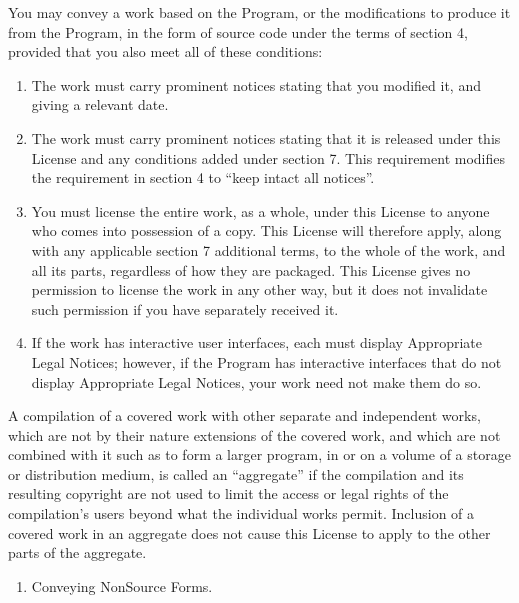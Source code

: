 \documentclass[letterpaper,10pt,english]{sphinxmanual}
\begin{document}
\sphinxAtStartPar
You may convey a work based on the Program, or the modifications to produce it from the Program, in the form of source code under the terms of section 4, provided that you also meet all of these conditions:
\begin{enumerate}
%
\item {} 
\sphinxAtStartPar
The work must carry prominent notices stating that you modified it, and giving a relevant date.

\item {} 
\sphinxAtStartPar
The work must carry prominent notices stating that it is released under this License and any conditions added under section 7. This requirement modifies the requirement in section 4 to “keep intact all notices”.

\item {} 
\sphinxAtStartPar
You must license the entire work, as a whole, under this License to anyone who comes into possession of a copy. This License will therefore apply, along with any applicable section 7 additional terms, to the whole of the work, and all its parts, regardless of how they are packaged. This License gives no permission to license the work in any other way, but it does not invalidate such permission if you have separately received it.

\item {} 
\sphinxAtStartPar
If the work has interactive user interfaces, each must display Appropriate Legal Notices; however, if the Program has interactive interfaces that do not display Appropriate Legal Notices, your work need not make them do so.

\end{enumerate}

\sphinxAtStartPar
A compilation of a covered work with other separate and independent works, which are not by their nature extensions of the covered work, and which are not combined with it such as to form a larger program, in or on a volume of a storage or distribution medium, is called an “aggregate” if the compilation and its resulting copyright are not used to limit the access or legal rights of the compilation’s users beyond what the individual works permit. Inclusion of a covered work in an aggregate does not cause this License to apply to the other parts of the aggregate.
\begin{enumerate}
%
\setcounter{enumi}{5}
\item {} 
\sphinxAtStartPar
Conveying Non\sphinxhyphen{}Source Forms.

\end{enumerate}
\end{document}

